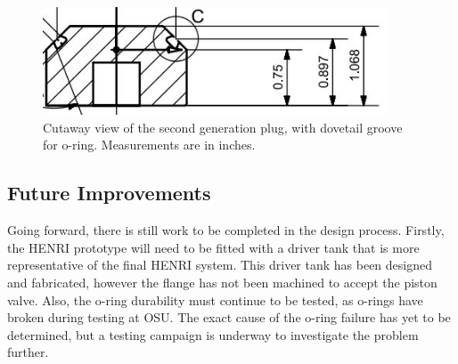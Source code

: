 
\begin{figure}[htbp]
    \vspace{16pt}
    \centering
    \includegraphics[width=4.032in]{design/photos/dovetail.JPG}
    \caption{Cutaway view of the second generation plug, with dovetail groove for o-ring. Measurements are in inches.}
    \label{fig:Dovetail Groove}
    \vspace{16pt}
\end{figure}




\subsection{Future Improvements} \label{s:improvements}
Going forward, there is still work to be completed in the design process. Firstly, the HENRI prototype will need to be fitted with a driver tank that is more representative of the final HENRI system. This driver tank has been designed and fabricated, however the flange has not been machined to accept the piston valve. Also, the o-ring durability must continue to be tested, as o-rings have broken during testing at OSU. The exact cause of the o-ring failure has yet to be determined, but a testing campaign is underway to investigate the problem further.



    

